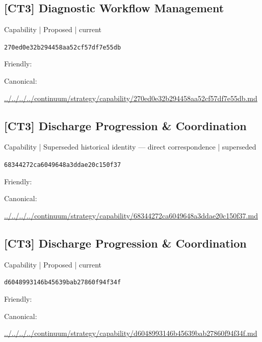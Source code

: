 \documentclass[10pt,a4paper]{article}
\begin{document}
\subsection*{[CT3] Diagnostic Workflow Management}
{\small Capability | Proposed | current}\par
\texttt{270ed0e32b294458aa52cf57df7e55db}\par
Friendly: \par
Canonical: \par
{\footnotesize\url{../../../../continuum/strategy/capability/270ed0e32b294458aa52cf57df7e55db.md}}\par
\subsection*{[CT3] Discharge Progression \& Coordination}
{\small Capability | Superseded historical identity — direct correspondence | superseded}\par
\texttt{68344272ca6049648a3ddae20c150f37}\par
Friendly: \par
Canonical: \par
{\footnotesize\url{../../../../continuum/strategy/capability/68344272ca6049648a3ddae20c150f37.md}}\par
\subsection*{[CT3] Discharge Progression \& Coordination}
{\small Capability | Proposed | current}\par
\texttt{d6048993146b45639bab27860f94f34f}\par
Friendly: \par
Canonical: \par
{\footnotesize\url{../../../../continuum/strategy/capability/d6048993146b45639bab27860f94f34f.md}}\par
\end{document}
